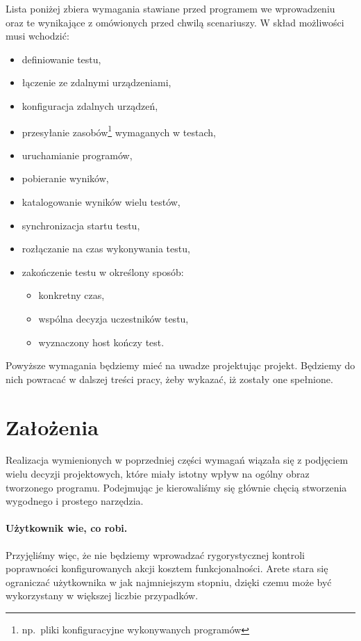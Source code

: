 \documentclass[00-praca-magisterska.tex]{subfiles}
\begin{document}
Lista poniżej zbiera wymagania stawiane przed programem we wprowadzeniu oraz te
wynikające z omówionych przed chwilą scenariuszy. W skład możliwości musi wchodzić:
\begin{itemize}
\item definiowanie testu,
\item łączenie ze zdalnymi urządzeniami,
\item konfiguracja zdalnych urządzeń,
\item przesyłanie zasobów\footnote{np.~pliki konfiguracyjne wykonywanych programów} wymaganych w testach,
\item uruchamianie programów,
\item pobieranie wyników,
\item katalogowanie wyników wielu testów,
\item synchronizacja startu testu,
\item rozłączanie na czas wykonywania testu,
\item zakończenie testu w określony sposób:
  \begin{itemize}
  \item konkretny czas,
  \item wspólna decyzja uczestników testu,
  \item wyznaczony host kończy test.
  \end{itemize}
\end{itemize}

Powyższe wymagania będziemy mieć na uwadze projektując projekt. Będziemy do
nich powracać w dalszej treści pracy, żeby wykazać, iż zostały one spełnione.

\section{Założenia}
\label{arete-zalozenia}

Realizacja wymienionych w poprzedniej części wymagań wiązała się z podjęciem
wielu decyzji projektowych, które miały istotny wpływ na ogólny obraz tworzonego
programu.  Podejmując je kierowaliśmy się głównie chęcią stworzenia wygodnego i
prostego narzędzia.

\paragraph{Użytkownik wie, co robi.} Przyjęliśmy więc, że nie będziemy
wprowadzać rygorystycznej kontroli poprawności konfigurowanych akcji kosztem
funkcjonalności. Arete stara się ograniczać użytkownika w jak najmniejszym stopniu,
dzięki czemu może być wykorzystany w większej liczbie przypadków.
\end{document}
